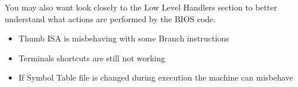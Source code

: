 You may also want look closely to the Low Level Handlers section to better understand what actions are performed by the BIOS code.


\begin{itemize}
\item Thumb ISA is misbehaving with some Branch instructions
\item Terminals shortcuts are still not working
\item If Symbol Table file is changed during execution the machine can misbehave

\end{itemize}
